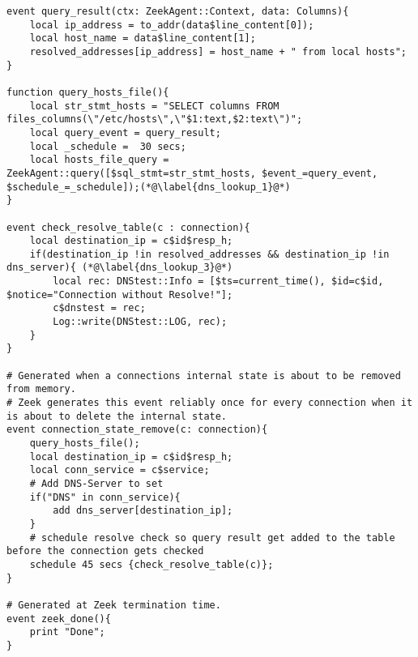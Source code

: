 \begin{lstlisting}[firstnumber=45,consecutivenumbers=false,label={Code_5},linerange={45-45,47-52,58-59,61-64,65-73},caption={Überprüfung der Verbindungsziele eines Endgerätes},numberblanklines=false]
event query_result(ctx: ZeekAgent::Context, data: Columns){
    local ip_address = to_addr(data$line_content[0]);
    local host_name = data$line_content[1];
    resolved_addresses[ip_address] = host_name + " from local hosts";
}

function query_hosts_file(){
    local str_stmt_hosts = "SELECT columns FROM files_columns(\"/etc/hosts\",\"$1:text,$2:text\")";
    local query_event = query_result;
    local _schedule =  30 secs;
    local hosts_file_query = ZeekAgent::query([$sql_stmt=str_stmt_hosts, $event_=query_event, $schedule_=_schedule]);(*@\label{dns_lookup_1}@*)   
}

event check_resolve_table(c : connection){
    local destination_ip = c$id$resp_h;
    if(destination_ip !in resolved_addresses && destination_ip !in dns_server){ (*@\label{dns_lookup_3}@*)
        local rec: DNStest::Info = [$ts=current_time(), $id=c$id, $notice="Connection without Resolve!"];
        c$dnstest = rec;
        Log::write(DNStest::LOG, rec);
    }
}

# Generated when a connections internal state is about to be removed from memory.
# Zeek generates this event reliably once for every connection when it is about to delete the internal state.
event connection_state_remove(c: connection){
    query_hosts_file();
    local destination_ip = c$id$resp_h;
    local conn_service = c$service;
    # Add DNS-Server to set
    if("DNS" in conn_service){
        add dns_server[destination_ip];
    }
    # schedule resolve check so query result get added to the table before the connection gets checked 
    schedule 45 secs {check_resolve_table(c)}; 
}

# Generated at Zeek termination time.
event zeek_done(){
    print "Done";
}
\end{lstlisting}

